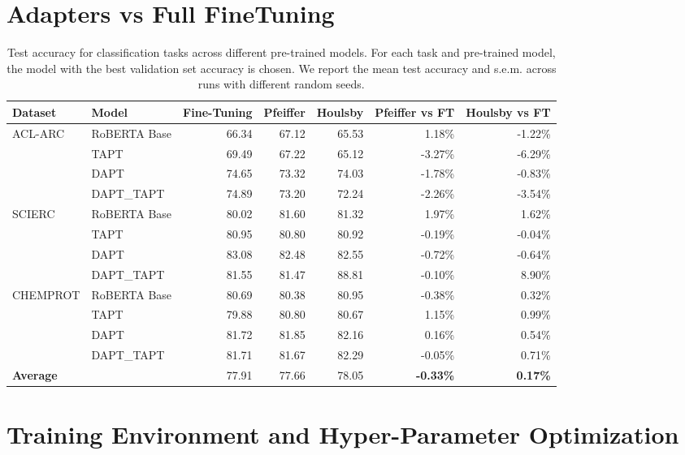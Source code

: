 \documentclass[10pt,twocolumn,letterpaper]{article}
\begin{document}
\section{Adapters vs Full FineTuning}
\begin{table}[h]
\centering

\begin{tabular}{llrrrrr}
\hline
\textbf{Dataset} & \textbf{Model} & \textbf{Fine-Tuning} & \textbf{Pfeiffer} & \textbf{Houlsby} & \textbf{Pfeiffer vs FT} & \textbf{Houlsby vs FT} \\
\hline
ACL-ARC & RoBERTA Base & 66.34 & 67.12 & 65.53 & 1.18\% & -1.22\% \\
& TAPT & 69.49 & 67.22 & 65.12 & -3.27\% & -6.29\% \\
& DAPT & 74.65 & 73.32 & 74.03 & -1.78\% & -0.83\% \\
& DAPT\_TAPT & 74.89 & 73.20 & 72.24 & -2.26\% & -3.54\% \\
\hline
SCIERC & RoBERTA Base & 80.02 & 81.60 & 81.32 & 1.97\% & 1.62\% \\
& TAPT & 80.95 & 80.80 & 80.92 & -0.19\% & -0.04\% \\
& DAPT & 83.08 & 82.48 & 82.55 & -0.72\% & -0.64\% \\
& DAPT\_TAPT & 81.55 & 81.47 & 88.81 & -0.10\% & 8.90\% \\
\hline
CHEMPROT & RoBERTA Base & 80.69 & 80.38 & 80.95 & -0.38\% & 0.32\% \\
& TAPT & 79.88 & 80.80 & 80.67 & 1.15\% & 0.99\% \\
& DAPT & 81.72 & 81.85 & 82.16 & 0.16\% & 0.54\% \\
& DAPT\_TAPT & 81.71 & 81.67 & 82.29 & -0.05\% & 0.71\% \\
\hline
\multicolumn{2}{l}{\textbf{Average}} & 77.91 & 77.66 & 78.05 & \textbf{-0.33\%} & \textbf{0.17\%} \\
\hline
\end{tabular}
\caption{Test accuracy for classification tasks across different pre-trained models. For each task and pre-trained model, the model with the best validation set accuracy is chosen. We report the mean test accuracy and s.e.m. across runs with
different random seeds.}
\label{table:adaptersvsft}
\end{table}

\newpage{}
\section{Training Environment and Hyper-Parameter Optimization}
\label{sec:besthyperparameters}
\end{document}
